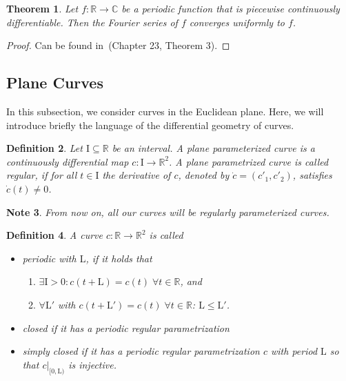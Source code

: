 \documentclass[a4paper]{book}
\newtheorem{theorem}{Theorem}%
\newtheorem{note}[theorem]{Note}%
\newtheorem{definition}[theorem]{Definition}%
\numberwithin{theorem}{section}%
\begin{document}
\begin{theorem}
    Let $f:\mathbb{R}\to\mathbb{C}$ be a periodic function that is piecewise continuously differentiable. Then the Fourier series of $f$ converges uniformly to $f$.
\end{theorem}
\begin{proof}
    Can be found in~\citep{forster2011analysis}(Chapter 23, Theorem 3).
\end{proof}

\subsection{Plane Curves}
In this subsection, we consider curves in the Euclidean plane. Here, we will introduce briefly the language of the differential geometry of curves.

\begin{definition}
    Let $\mathrm{I}\subseteq\mathbb{R}$ be an interval. A \textit{plane parameterized curve} is a continuously differential map $c:\mathrm{I}\to\mathbb{R}^{2}$. A plane parametrized curve is called \textit{regular}, if for all $t\in\mathrm{I}$ the derivative of $c$, denoted by $\dot{c}=(c'_{1},c'_{2})$, satisfies $\dot{c}(t)\neq0$.
\end{definition} 

\begin{note}
    From now on, all our curves will be regularly parameterized curves.
\end{note}

\begin{definition}
    A curve $c:\mathbb{R}\to\mathbb{R}^{2}$ is called
    \begin{itemize}
        \item periodic with $\mathrm{L}$, if it holds that
        \begin{enumerate}
            \item $\exists\mathrm{I}>0: c(t+\mathrm{L})=c(t)\;\forall t\in\mathbb{R}$, and
            \item $\forall\mathrm{L}'$ with $c(t+\mathrm{L}')=c(t)\;\forall t\in\mathbb{R}$: $\mathrm{L}\leq\mathrm{L}'$.
        \end{enumerate}
        \item closed if it has a periodic regular parametrization
        \item simply closed if it has a periodic regular parametrization $c$ with period $\mathrm{L}$ so that $c|_{[0,\mathrm{L})}$ is injective.
    \end{itemize}
\end{definition}
\end{document}
